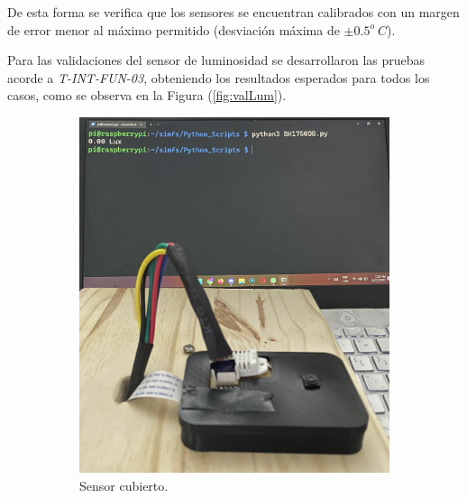 De esta forma se verifica que los sensores se encuentran calibrados con un margen de error menor al máximo permitido (desviación máxima de $\pm 0.5^o \ C$).

Para las validaciones del sensor de luminosidad se desarrollaron las pruebas acorde a \textit{T-INT-FUN-03}, obteniendo los resultados esperados para todos los casos, como se observa en la Figura (\ref{fig:valLum}).
\begin{figure}[H]
	\centering
    \begin{subfigure}{0.33\textwidth}
    	\centering
        \includegraphics[width=\linewidth]{ImagenesValidacion del prototipo/TINTFUN3a}
        \caption{Sensor cubierto.}
	\end{subfigure}\hfill
    \begin{subfigure}{0.33\textwidth}
    	\centering

\end{subfigure}
\end{figure}
